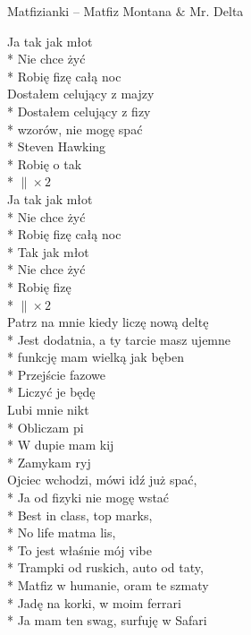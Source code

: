 \begin{piosenka_dluga}{Matfizianki -- Matfiz Montana $\&$ Mr. Delta}

Ja tak jak młot \\*
Nie chce żyć \\*
Robię fizę całą noc \\[\zwrotkaspace]

 Dostałem celujący z majzy \\*
 Dostałem celujący z fizy \\*
 wzorów, nie mogę spać \\*
 Steven Hawking \\*
 Robię o tak \\*
 $\| \times 2$ \\[\zwrotkaspace]

 Ja tak jak młot \\*
 Nie chce żyć \\*
 Robię fizę całą noc \\*
 Tak jak młot \\*
 Nie chce żyć \\*
 Robię fizę \\*
 $\| \times 2$ \\[\zwrotkaspace]

Patrz na mnie kiedy liczę nową deltę \\*
Jest dodatnia, a ty tarcie masz ujemne \\*
funkcję mam wielką jak bęben \\*
Przejście fazowe \\*
Liczyć je będę \\[\zwrotkaspace]

Lubi mnie nikt \\*
Obliczam pi \\*
W dupie mam kij \\*
Zamykam ryj \\[\zwrotkaspace]

Ojciec wchodzi, mówi idź już spać, \\*
Ja od fizyki nie mogę wstać \\*
Best in class, top marks, \\*
No life matma lis, \\*
To jest właśnie mój vibe \\*
Trampki od ruskich, auto od taty, \\*
Matfiz w humanie, oram te szmaty \\*
Jadę na korki, w moim ferrari \\*
Ja mam ten swag, surfuję w Safari \\[\zwrotkaspace]


\end{piosenka_dluga}
